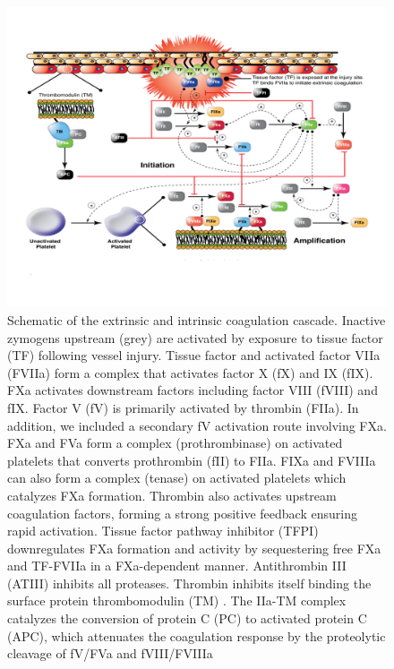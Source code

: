 \documentclass[12pt]{article}
\begin{document}
\begin{figure}[H]
\centering
\includegraphics[width=1.00\textwidth,height=0.7\textheight]{./figs/Figure_2_CoagulationNetwork.pdf}
\caption{Schematic of the extrinsic and intrinsic coagulation cascade. Inactive zymogens upstream (grey) are activated by exposure to tissue factor (TF)  following vessel injury. Tissue factor and activated factor VIIa (FVIIa) form a complex that activates factor X (fX) and IX (fIX). FXa activates downstream factors including factor VIII (fVIII) and fIX. Factor V (fV) is primarily activated by thrombin (FIIa). In addition, we included a secondary fV activation route involving FXa. FXa and FVa form a complex (prothrombinase) on activated platelets that converts prothrombin (fII) to FIIa. FIXa and FVIIIa can also form a complex (tenase) on activated platelets which catalyzes FXa formation.  Thrombin also activates upstream coagulation factors, forming a strong positive feedback ensuring rapid activation. Tissue factor pathway inhibitor (TFPI) downregulates FXa formation and activity by sequestering free FXa and TF-FVIIa in a FXa-dependent manner. Antithrombin III (ATIII)  inhibits all proteases. Thrombin inhibits itself binding the surface protein thrombomodulin (TM) . The IIa-TM complex catalyzes the conversion of protein C (PC) to activated protein C (APC), which attenuates the coagulation response by the proteolytic cleavage of fV/FVa and fVIII/FVIIIa }\label{fig-network}
\end{figure}
\end{document}
